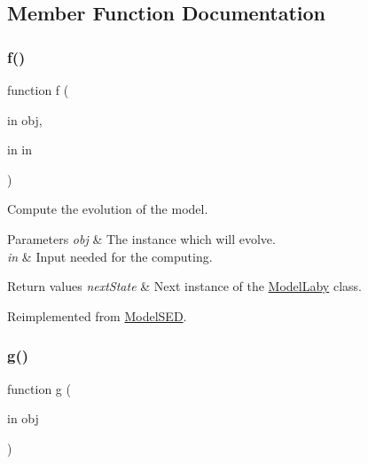 \subsection{Member Function Documentation}
\mbox{\label{class_model_laby_a6f3b146c92a207e95690d08975e1e072}} 
\subsubsection{\texorpdfstring{f()}{f()}}
{\footnotesize\ttfamily function f (\begin{DoxyParamCaption}\item[{in}]{obj,  }\item[{in}]{in }\end{DoxyParamCaption})\hspace{0.3cm}{\ttfamily [virtual]}}



Compute the evolution of the model. 


\begin{DoxyParams}{Parameters}
{\em obj} & The instance which will evolve. \\
\hline
{\em in} & Input needed for the computing. \\
\hline
\end{DoxyParams}

\begin{DoxyRetVals}{Return values}
{\em next\+State} & Next instance of the \hyperlink{class_model_laby}{Model\+Laby} class. \\
\hline
\end{DoxyRetVals}


Reimplemented from \hyperlink{class_model_s_e_d_ac36f9451c43b120828af4380858f2024}{Model\+S\+ED}.

\mbox{\label{class_model_laby_a07dadfabe92bf9a144b8a862720e7746}} 
\subsubsection{\texorpdfstring{g()}{g()}}
{\footnotesize\ttfamily function g (\begin{DoxyParamCaption}\item[{in}]{obj }\end{DoxyParamCaption})\hspace{0.3cm}{\ttfamily [virtual]}}



